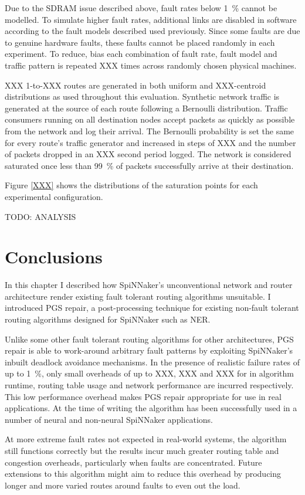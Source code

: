 			Due to the SDRAM issue described above, fault rates below
			\SI{1}{\percent} cannot be modelled.  To simulate higher fault rates,
			additional links are disabled in software according to the fault models
			described used previously. Since some faults are due to genuine hardware
			faults, these faults cannot be placed randomly in each experiment. To
			reduce, bias each combination of fault rate, fault model and traffic
			pattern is repeated XXX times across randomly chosen physical machines.
			
			XXX 1-to-XXX routes are generated in both uniform and XXX-centroid
			distributions as used throughout this evaluation. Synthetic network
			traffic is generated at the source of each route following a Bernoulli
			distribution. Traffic consumers running on all destination nodes accept
			packets as quickly as possible from the network and log their arrival.
			The Bernoulli probability is set the same for every route's traffic
			generator and increased in steps of XXX and the number of packets dropped
			in an XXX second period logged. The network is considered saturated once
			less than \SI{99}{\percent} of packets successfully arrive at their
			destination.
			
			Figure \ref{XXX} shows the distributions of the saturation points for
			each experimental configuration.
			
			TODO: ANALYSIS
		
	\section{Conclusions}
		
		In this chapter I described how SpiNNaker's unconventional network and
		router architecture render existing fault tolerant routing algorithms
		unsuitable. I introduced PGS repair, a post-processing technique for
		existing non-fault tolerant routing algorithms designed for SpiNNaker such
		as NER.
		
		Unlike some other fault tolerant routing algorithms for other
		architectures, PGS repair is able to work-around arbitrary fault patterns
		by exploiting SpiNNaker's inbuilt deadlock avoidance mechanisms. In the
		presence of realistic failure rates of up to \SI{1}{\percent}, only small
		overheads of up to XXX, XXX and XXX for in algorithm runtime, routing table
		usage and network performance are incurred respectively. This low
		performance overhead makes PGS repair appropriate for use in real
		applications. At the time of writing the algorithm has been successfully
		used in a number of neural and non-neural SpiNNaker applications.
		
		At more extreme fault rates not expected in real-world systems, the
		algorithm still functions correctly but the results incur much greater
		routing table and congestion overheads, particularly when faults are
		concentrated. Future extensions to this algorithm might aim to reduce this
		overhead by producing longer and more varied routes around faults to even
		out the load.
